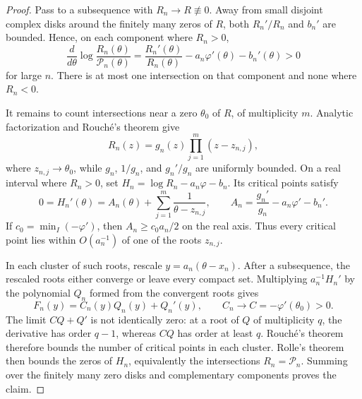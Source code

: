 \begin{proof}
Pass to a subsequence with \(R_n\to R\not\equiv0\). Away from small disjoint
complex disks around the finitely many zeros of \(R\), both \(R_n'/R_n\) and
\(b_n'\) are bounded. Hence, on each component where \(R_n>0\),
\[
 \frac{d}{d\theta}\log\frac{R_n(\theta)}{\mathcal P_n(\theta)}
 =\frac{R_n'(\theta)}{R_n(\theta)}-a_n\varphi'(\theta)-b_n'(\theta)>0
\]
for large \(n\). There is at most one intersection on that component and none
where \(R_n<0\).

It remains to count intersections near a zero \(\theta_0\) of \(R\), of
multiplicity \(m\). Analytic factorization and Rouch\'e's theorem give
\[
    R_n(z)=g_n(z)\prod_{j=1}^m(z-z_{n,j}),
\]
where \(z_{n,j}\to\theta_0\), while \(g_n\), \(1/g_n\), and
\(g_n'/g_n\) are uniformly bounded. On a real interval where \(R_n>0\), set
\(H_n=\log R_n-a_n\varphi-b_n\). Its critical points satisfy
\begin{equation}
\label{eq:support-steep-log-derivative}
 0=H_n'(\theta)=A_n(\theta)+\sum_{j=1}^m\frac1{\theta-z_{n,j}},
 \qquad
 A_n=\frac{g_n'}{g_n}-a_n\varphi'-b_n'.
\end{equation}
If \(c_0=\min_I(-\varphi')\), then \(A_n\ge c_0a_n/2\) on the real axis.
Thus every critical point lies within \(O(a_n^{-1})\) of one of the roots
\(z_{n,j}\).

In each cluster of such roots, rescale \(y=a_n(\theta-x_n)\). After a
subsequence, the rescaled roots either converge or leave every compact set.
Multiplying \(a_n^{-1}H_n'\) by the polynomial \(Q_n\) formed from the
convergent roots gives
\[
    F_n(y)=C_n(y)Q_n(y)+Q_n'(y),
    \qquad C_n\to C=-\varphi'(\theta_0)>0.
\]
The limit \(CQ+Q'\) is not identically zero: at a root of \(Q\) of
multiplicity \(q\), the derivative has order \(q-1\), whereas \(CQ\) has
order at least \(q\). Rouch\'e's theorem therefore bounds the number of
critical points in each cluster. Rolle's theorem then bounds the zeros of
\(H_n\), equivalently the intersections \(R_n=\mathcal P_n\). Summing over the
finitely many zero disks and complementary components proves the claim.
\end{proof}

